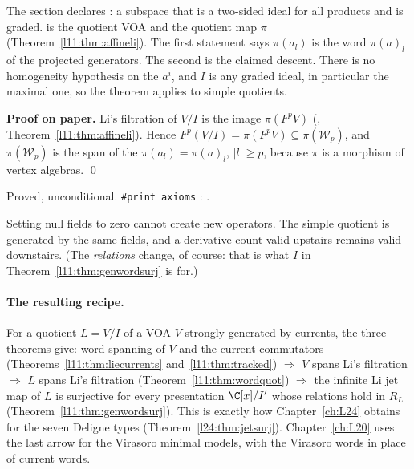 \begin{dictionary}
The section  declares :
a subspace that is a two-sided ideal for all products and is graded.  is the quotient
VOA and  the quotient map $\pi$ (Theorem~\ref{l11:thm:affineli}). The first statement says $\pi(a_l)$ is the
word $\pi(a)_l$ of the projected generators. The second is the claimed descent. There is no homogeneity hypothesis on
the $a^i$, and $I$ is any graded ideal, in particular the maximal one, so the theorem applies to simple quotients.
\end{dictionary}

\textbf{Proof on paper.} Li's filtration of $V/I$ is the image $\pi(F^pV)$
(\allowbreak{}\allowbreak{}, Theorem~\ref{l11:thm:affineli}). Hence
$F^p(V/I) = \pi(F^pV)\subseteq\pi(\mathcal W_p)$, and $\pi(\mathcal W_p)$ is the span of the $\pi(a_l) = \pi(a)_l$, $|l|\ge p$, because $\pi$ is a
morphism of vertex algebras. \qed

\begin{status}
Proved, unconditional. \texttt{\#print axioms}
\allowbreak{}\allowbreak{}: \lean{[propext, Classical.}\allowbreak{}\allowbreak\lean{sound]}.
\end{status}

\begin{physics}
Setting null fields to zero cannot create new operators. The simple quotient is generated by the same fields, and a
derivative count valid upstairs remains valid downstairs. (The \emph{relations} change, of course: that is what $I$ in
Theorem~\ref{l11:thm:genwordsurj} is for.)
\end{physics}

\paragraph{The resulting recipe.} For a quotient $L = V/I$ of a VOA $V$ strongly generated by currents, the three theorems
give: word spanning of $V$ and the current commutators (Theorems~\ref{l11:thm:liecurrents} and~\ref{l11:thm:tracked})
$\Rightarrow$ $V$ spans Li's filtration $\Rightarrow$ $L$ spans Li's filtration (Theorem~\ref{l11:thm:wordquot}) $\Rightarrow$
the infinite Li jet map of $L$ is surjective for every presentation $\C[x]/I'$ whose relations hold in $R_L$
(Theorem~\ref{l11:thm:genwordsurj}). This is exactly how Chapter~\ref{ch:L24} obtains  for the
seven Deligne types (Theorem~\ref{l24:thm:jetsurj}). Chapter~\ref{ch:L20} uses the last arrow for the Virasoro minimal
models, with the Virasoro words in place of current words.

